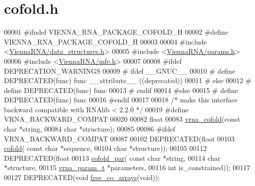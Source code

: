 \hypertarget{cofold_8h_source}{}\section{cofold.\+h}
\label{cofold_8h_source}

\begin{DoxyCode}
00001 \textcolor{preprocessor}{#ifndef VIENNA\_RNA\_PACKAGE\_COFOLD\_H}
00002 \textcolor{preprocessor}{#define VIENNA\_RNA\_PACKAGE\_COFOLD\_H}
00003 
00004 \textcolor{preprocessor}{#include <\hyperlink{data__structures_8h}{ViennaRNA/data\_structures.h}>}
00005 \textcolor{preprocessor}{#include <\hyperlink{params_8h}{ViennaRNA/params.h}>}
00006 \textcolor{preprocessor}{#include <\hyperlink{mfe_8h}{ViennaRNA/mfe.h}>}
00007 
00008 \textcolor{preprocessor}{#ifdef DEPRECATION\_WARNINGS}
00009 \textcolor{preprocessor}{# ifdef \_\_GNUC\_\_}
00010 \textcolor{preprocessor}{#  define DEPRECATED(func) func \_\_attribute\_\_ ((deprecated))}
00011 \textcolor{preprocessor}{# else}
00012 \textcolor{preprocessor}{#  define DEPRECATED(func) func}
00013 \textcolor{preprocessor}{# endif}
00014 \textcolor{preprocessor}{#else}
00015 \textcolor{preprocessor}{# define DEPRECATED(func) func}
00016 \textcolor{preprocessor}{#endif}
00017 
00018 \textcolor{comment}{/* make this interface backward compatible with RNAlib < 2.2.0 */}
00019 \textcolor{preprocessor}{#define VRNA\_BACKWARD\_COMPAT}
00020 
00082 \textcolor{keywordtype}{float}
00083 \hyperlink{group__mfe__cofold_ga45515db181f17653ef7ef5487ef36d08}{vrna\_cofold}(\textcolor{keyword}{const} \textcolor{keywordtype}{char} *\textcolor{keywordtype}{string},
00084             \textcolor{keywordtype}{char} *structure);
00085 
00086 \textcolor{preprocessor}{#ifdef VRNA\_BACKWARD\_COMPAT}
00087 
00102 DEPRECATED(\textcolor{keywordtype}{float}
00103 \hyperlink{group__mfe__cofold_gabc8517f22cfe70595ee81fc837910d52}{cofold}( \textcolor{keyword}{const} \textcolor{keywordtype}{char} *sequence,
00104         \textcolor{keywordtype}{char} *structure));
00105 
00112 DEPRECATED(\textcolor{keywordtype}{float}
00113 \hyperlink{group__mfe__cofold_ga7612cfeeb1b793f1e4179b1eb53df1f3}{cofold\_par}( \textcolor{keyword}{const} \textcolor{keywordtype}{char} *\textcolor{keywordtype}{string},
00114             \textcolor{keywordtype}{char} *structure,
00115             \hyperlink{group__energy__parameters_structvrna__param__s}{vrna\_param\_t} *parameters,
00116             \textcolor{keywordtype}{int} is\_constrained));
00117 
00127 DEPRECATED(\textcolor{keywordtype}{void} \hyperlink{group__mfe__cofold_gaafb33d7473eb9af9d1b168ca8761c41a}{free\_co\_arrays}(\textcolor{keywordtype}{void}));

\end{DoxyCode}
